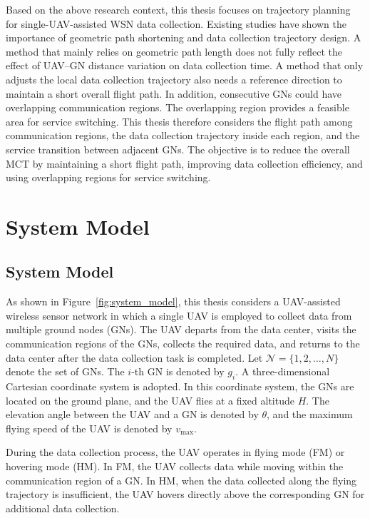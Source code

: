 \documentclass[12pt]{ksthesis}
\begin{document}
\begin{thesis}
{    Based on the above research context, this thesis focuses on trajectory planning for single-UAV-assisted WSN data collection. Existing studies have shown the importance of geometric path shortening and data collection trajectory design. A method that mainly relies on geometric path length does not fully reflect the effect of UAV--GN distance variation on data collection time. A method that only adjusts the local data collection trajectory also needs a reference direction to maintain a short overall flight path. In addition, consecutive GNs could have overlapping communication regions. The overlapping region provides a feasible area for service switching. This thesis therefore considers the flight path among communication regions, the data collection trajectory inside each region, and the service transition between adjacent GNs. The objective is to reduce the overall MCT by maintaining a short flight path, improving data collection efficiency, and using overlapping regions for service switching.
    
\chapter{System Model}\label{Chap:Problem Formulation}

\section{System Model}

    As shown in Figure~\ref{fig:system_model}, this thesis considers a UAV-assisted wireless sensor network in which a single UAV is employed to collect data from multiple ground nodes (GNs). The UAV departs from the data center, visits the communication regions of the GNs, collects the required data, and returns to the data center after the data collection task is completed. Let \(\mathcal{N}=\{1, 2,\ldots, N\}\) denote the set of GNs. The \(i\)-th GN is denoted by \(g_i\). A three-dimensional Cartesian coordinate system is adopted. In this coordinate system, the GNs are located on the ground plane, and the UAV flies at a fixed altitude \(H\). The elevation angle between the UAV and a GN is denoted by \(\theta\), and the maximum flying speed of the UAV is denoted by \(v_{\max}\).
    
    During the data collection process, the UAV operates in flying mode (FM) or hovering mode (HM). In FM, the UAV collects data while moving within the communication region of a GN. In HM, when the data collected along the flying trajectory is insufficient, the UAV hovers directly above the corresponding GN for additional data collection.
    
}
\end{thesis}
\end{document}
